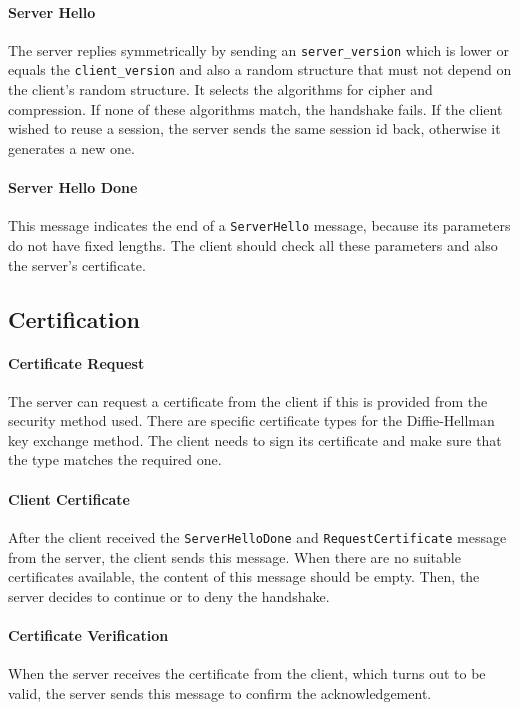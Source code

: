 \documentclass[paper=a4, fontsize=11pt]{scrartcl} %
\numberwithin{equation}{section} %
\numberwithin{figure}{section} %
\numberwithin{table}{section} %
\begin{document}
\paragraph{Server Hello} The server replies symmetrically by sending an \verb|server_version| which is lower or equals the \verb|client_version| and also a random structure that must not depend on the client's random structure. It selects the algorithms for cipher and compression. If none of these algorithms match, the handshake fails. If the client wished to reuse a session, the server sends the same session id back, otherwise it generates a new one.
\paragraph{Server Hello Done}
This message indicates the end of a \verb|ServerHello| message, because its parameters do not have fixed lengths. The client should check all these parameters and also the server's certificate.

\subsection{Certification}
\paragraph{Certificate Request}
The server can request a certificate from the client if this is provided from the security method used. There are specific certificate types for the Diffie-Hellman key exchange method. The client needs to sign its certificate and make sure that the type matches the required one.
\paragraph{Client Certificate}
\begin{sloppypar}
After the client received the \verb|ServerHelloDone| and \verb|RequestCertificate| message from the server, the client sends this message. When there are no suitable certificates available, the content of this message should be empty. Then, the server decides to continue or to deny the handshake.
\end{sloppypar}
\paragraph{Certificate Verification}
When the server receives the certificate from the client, which turns out to be valid, the server sends this message to confirm the acknowledgement.
\end{document}
